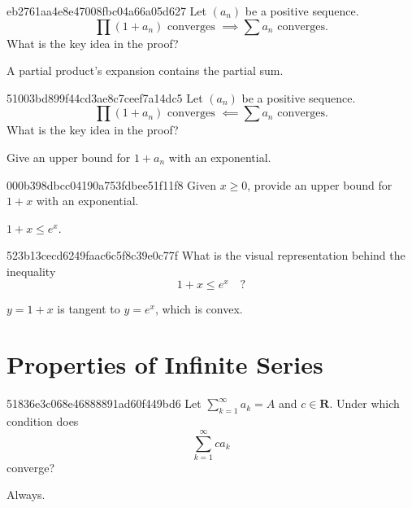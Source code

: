 \begin{note}{eb2761aa4e8e47008fbc04a66a05d627}
    Let \({ (a_n) }\) be a positive sequence.
    \[
        \prod \left( 1 + a_n \right) \text{ converges } \implies \sum a_n \text{ converges.}
    \]
    What is the key idea in the proof?

    \begin{cloze}{1}
        A partial product's expansion contains the partial sum.
    \end{cloze}
\end{note}

\begin{note}{51003bd899f44cd3ae8c7ceef7a14dc5}
    Let \({ (a_n) }\) be a positive sequence.
    \[
        \prod \left( 1 + a_n \right) \text{ converges } \impliedby \sum a_n \text{ converges.}
    \]
    What is the key idea in the proof?

    \begin{cloze}{1}
        Give an upper bound for \({ 1 + a_n }\) with an exponential.
    \end{cloze}
\end{note}

\begin{note}{000b398dbcc04190a753fdbee51f11f8}
    Given \({ x \geq 0 }\), provide an upper bound for \({ 1 + x }\) with an exponential.

    \begin{cloze}{1}
        \({ 1 + x \leq e^{x} }\).
    \end{cloze}
\end{note}

\begin{note}{523b13cecd6249faac6c5f8c39e0c77f}
    What is the visual representation behind the inequality
    \[
        1 + x \leq e^{x} \quad \text{?}
    \]

    \begin{cloze}{1}
        \({ y = 1 + x }\) is tangent to \({ y = e^{x} }\), which is convex.
    \end{cloze}
\end{note}

\section{Properties of Infinite Series} %
\begin{note}{51836e3c068e46888891ad60f449bd6}
    Let \({ \sum_{k=1}^{\infty} a_k = A }\) and \({ c \in \mathbf{R} }\).
    Under which condition does
    \[
        \sum_{k=1}^{\infty} ca_k
    \]
    converge?

    \begin{cloze}{1}
        Always.
    \end{cloze}
\end{note}


